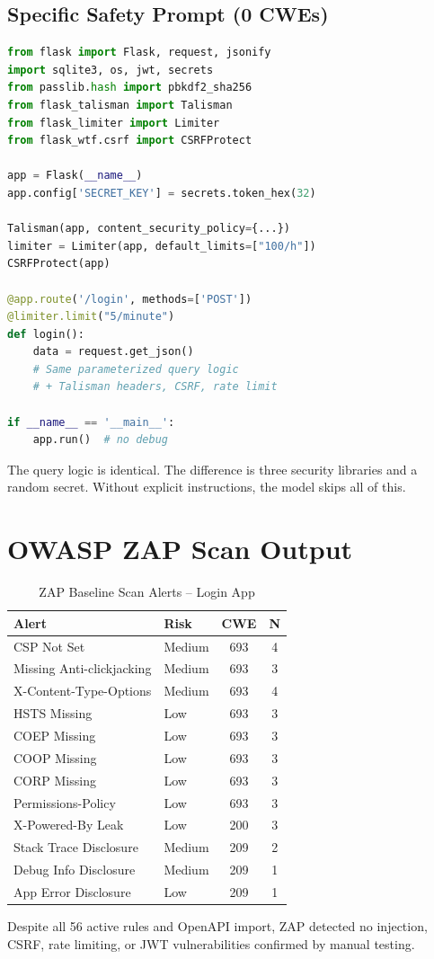 \documentclass[conference,a4paper]{IEEEtran}
\begin{document}
\subsection{Specific Safety Prompt (0 CWEs)}
\begin{lstlisting}[language=Python]
from flask import Flask, request, jsonify
import sqlite3, os, jwt, secrets
from passlib.hash import pbkdf2_sha256
from flask_talisman import Talisman
from flask_limiter import Limiter
from flask_wtf.csrf import CSRFProtect

app = Flask(__name__)
app.config['SECRET_KEY'] = secrets.token_hex(32)

Talisman(app, content_security_policy={...})
limiter = Limiter(app, default_limits=["100/h"])
CSRFProtect(app)

@app.route('/login', methods=['POST'])
@limiter.limit("5/minute")
def login():
    data = request.get_json()
    # Same parameterized query logic
    # + Talisman headers, CSRF, rate limit

if __name__ == '__main__':
    app.run()  # no debug
\end{lstlisting}

The query logic is identical. The difference is three security libraries and a random secret. Without explicit instructions, the model skips all of this.

\section{OWASP ZAP Scan Output}

\begin{table}[htbp]
\caption{ZAP Baseline Scan Alerts -- Login App}
\label{tab:zap_alerts}
\centering
\scriptsize
\begin{tabular}{llcc}
\toprule
\textbf{Alert} & \textbf{Risk} & \textbf{CWE} & \textbf{N} \\
\midrule
CSP Not Set & Medium & 693 & 4 \\
Missing Anti-clickjacking & Medium & 693 & 3 \\
X-Content-Type-Options & Medium & 693 & 4 \\
HSTS Missing & Low & 693 & 3 \\
COEP Missing & Low & 693 & 3 \\
COOP Missing & Low & 693 & 3 \\
CORP Missing & Low & 693 & 3 \\
Permissions-Policy & Low & 693 & 3 \\
X-Powered-By Leak & Low & 200 & 3 \\
Stack Trace Disclosure & Medium & 209 & 2 \\
Debug Info Disclosure & Medium & 209 & 1 \\
App Error Disclosure & Low & 209 & 1 \\
\bottomrule
\end{tabular}
\end{table}

Despite all 56 active rules and OpenAPI import, ZAP detected no injection, CSRF, rate limiting, or JWT vulnerabilities confirmed by manual testing.
\end{document}

